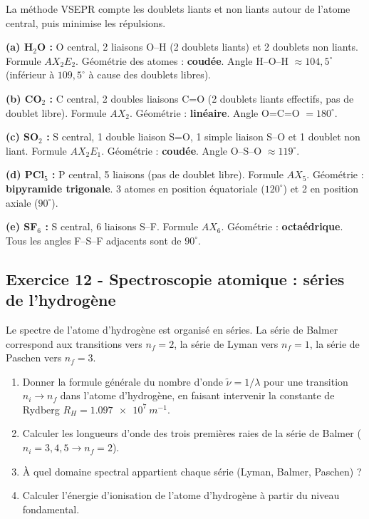 \documentclass[12pt,a4paper]{article}
\begin{document}
\begin{boitecorrige}
La méthode VSEPR compte les doublets liants et non liants autour de l'atome central, puis minimise les répulsions.

\textbf{(a) H$_2$O :} O central, 2 liaisons O--H (2 doublets liants) et 2 doublets non liants. Formule $AX_2E_2$. Géométrie des atomes : \textbf{coudée}. Angle H--O--H $\approx 104{,}5^\circ$ (inférieur à $109{,}5^\circ$ à cause des doublets libres).

\textbf{(b) CO$_2$ :} C central, 2 doubles liaisons C=O (2 doublets liants effectifs, pas de doublet libre). Formule $AX_2$. Géométrie : \textbf{linéaire}. Angle O=C=O $= 180^\circ$.

\textbf{(c) SO$_2$ :} S central, 1 double liaison S=O, 1 simple liaison S--O et 1 doublet non liant. Formule $AX_2E_1$. Géométrie : \textbf{coudée}. Angle O--S--O $\approx 119^\circ$.

\textbf{(d) PCl$_5$ :} P central, 5 liaisons (pas de doublet libre). Formule $AX_5$. Géométrie : \textbf{bipyramide trigonale}. 3 atomes en position équatoriale ($120^\circ$) et 2 en position axiale ($90^\circ$).

\textbf{(e) SF$_6$ :} S central, 6 liaisons S--F. Formule $AX_6$. Géométrie : \textbf{octaédrique}. Tous les angles F--S--F adjacents sont de $90^\circ$.
\end{boitecorrige}

\subsection*{Exercice 12 - Spectroscopie atomique : séries de l'hydrogène \niveau{\moyen}}

\begin{boiteexercice}
Le spectre de l'atome d'hydrogène est organisé en séries. La série de Balmer correspond aux transitions vers $n_f = 2$, la série de Lyman vers $n_f = 1$, la série de Paschen vers $n_f = 3$.
\begin{enumerate}
  \item Donner la formule générale du nombre d'onde $\tilde{\nu} = 1/\lambda$ pour une transition $n_i \to n_f$ dans l'atome d'hydrogène, en faisant intervenir la constante de Rydberg $R_H = \qty{1.097e7}{m^{-1}}$.
  \item Calculer les longueurs d'onde des trois premières raies de la série de Balmer ($n_i = 3,4,5 \to n_f = 2$).
  \item À quel domaine spectral appartient chaque série (Lyman, Balmer, Paschen) ?
  \item Calculer l'énergie d'ionisation de l'atome d'hydrogène à partir du niveau fondamental.
\end{enumerate}
\end{boiteexercice}
\end{document}
